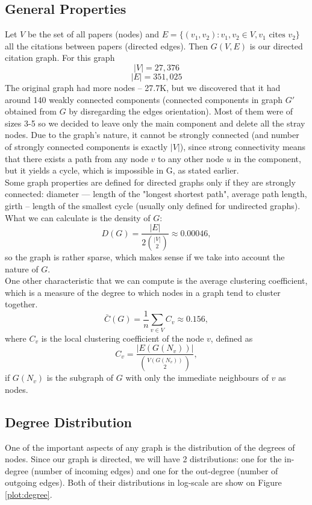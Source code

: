 \documentclass{article}
\newcommand\tab[1][1cm]{\hspace*{#1}}
\begin{document}
\subsection{General Properties}

\tab Let $V$ be the set of all papers (nodes) and $E = \{(v_1, v_2): v_1, v_2 \in V, v_1 \text{ cites } v_2 \}$ all the citations between papers (directed edges). Then $G(V, E)$ is our directed citation graph.
For this graph $$|V| = 27,376$$ $$|E| = 351,025$$
\tab The original graph had more nodes -- 27.7K, but we discovered that it had around 140 weakly connected components (connected components in graph $G'$ obtained from $G$ by disregarding the edges orientation). Most of them were of sizes 3-5 so we decided to leave only the main component and delete all the stray nodes. Due to the graph's nature, it cannot be strongly connected (and number of strongly connected components is exactly $|V|$), since strong connectivity means that there exists a path from any node $v$ to any other node $u$ in the component, but it yields a cycle, which is impossible in G, as stated earlier. \\
\tab Some graph properties are defined for directed graphs only if they are strongly connected: diameter --- length of the "longest shortest path", average path length, girth -- length of the smallest cycle (usually only defined for undirected graphs). What we can calculate is the density of $G$:
$$D(G) = \frac{|E|}{2\binom{|V|}{2}} \approx 0.00046,$$
so the graph is rather sparse, which makes sense if we take into account the nature of $G$.\\
\tab One other characteristic that we can compute is the average clustering coefficient, which is a measure of the degree to which nodes in a graph tend to cluster together. 
$$\bar{C}(G) = \frac{1}{n}\sum_{v \in V}C_v \approx 0.156,$$
where $C_v$ is the local clustering coefficient of the node $v$, defined as $$C_v = \frac{|E(G(N_v))|}{\binom{V(G(N_v))}{2}},$$
if $G(N_v)$ is the subgraph of $G$ with only the immediate neighbours of $v$  as nodes.

\subsection{Degree Distribution}
\tab One of the important aspects of any graph is the distribution of the degrees of nodes. Since our graph is directed, we will have 2 distributions: one for the in-degree (number of incoming edges) and one for the out-degree (number of outgoing edges). Both of their distributions in log-scale are show on Figure \ref{plot:degree}.
\end{document}
